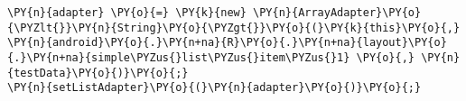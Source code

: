 \begin{Verbatim}[commandchars=\\\{\}]
\PY{n}{adapter} \PY{o}{=} \PY{k}{new} \PY{n}{ArrayAdapter}\PY{o}{\PYZlt{}}\PY{n}{String}\PY{o}{\PYZgt{}}\PY{o}{(}\PY{k}{this}\PY{o}{,} \PY{n}{android}\PY{o}{.}\PY{n+na}{R}\PY{o}{.}\PY{n+na}{layout}\PY{o}{.}\PY{n+na}{simple\PYZus{}list\PYZus{}item\PYZus{}1} \PY{o}{,} \PY{n}{testData}\PY{o}{)}\PY{o}{;}
\PY{n}{setListAdapter}\PY{o}{(}\PY{n}{adapter}\PY{o}{)}\PY{o}{;}
\end{Verbatim}
